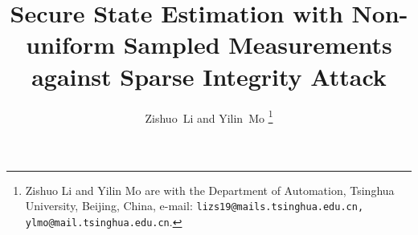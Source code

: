 \documentclass[12pt]{article}
\begin{document}
%
\title{Secure State Estimation with Non-uniform Sampled Measurements against Sparse Integrity Attack}
%
%
%

\author{Zishuo~Li and Yilin~Mo
\thanks{Zishuo Li and Yilin Mo are with the Department
of Automation, Tsinghua University, Beijing, China, e-mail: \texttt{lizs19@mails.tsinghua.edu.cn, ylmo@mail.tsinghua.edu.cn}. } }%


% 
%



% 
\end{document}
